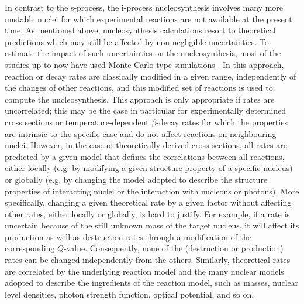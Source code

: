 \documentclass{aa}
\begin{document}
In contrast to the s-process, the i-process nucleosynthesis involves many more unstable nuclei for which experimental reactions are not available at the present time. As mentioned above, nucleosynthesis calculations resort to theoretical predictions which may still be affected by non-negligible uncertainties. To estimate the impact of such uncertainties on the nucleosynthesis, most of the studies up to now have used Monte Carlo-type simulations \cite[e.g.][]{McKay19}. In this approach, reaction or decay rates are classically modified in a given range, independently of the changes of other reactions, and this modified set of reactions is used to compute the nucleosynthesis. This approach is only appropriate if rates are uncorrelated; this may be the case in particular for experimentally determined cross sections or temperature-dependent $\beta$-decay rates for which the properties are intrinsic to the specific case and do not affect reactions on neighbouring nuclei. However, in the case of theoretically derived cross sections, all rates are predicted by a given model that defines the correlations between all reactions, either locally (e.g. by modifying a given structure property of a specific nucleus) or globally (e.g. by changing the model adopted to describe the structure properties of interacting nuclei or the interaction with nucleons or photons). More specifically, changing a given theoretical rate by a given factor without affecting other rates, either locally or globally, is hard to justify. For example, if a rate is uncertain because of the still unknown mass of the target nucleus, it will affect its production as well as destruction rates through a modification of the corresponding $Q$-value. Consequently, none of the (destruction or production) rates can be changed independently from the others. Similarly, theoretical rates are correlated by the underlying reaction model and the many nuclear models adopted to describe the ingredients of the reaction model, such as masses, nuclear level densities, photon strength function, optical potential, and so on.
\end{document}

